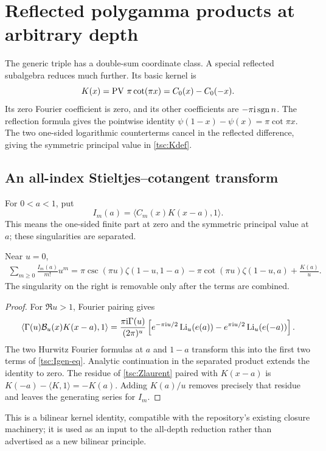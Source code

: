 \section{Reflected polygamma products at arbitrary depth}\label{tsc:reflected}
The generic triple has a double-sum coordinate class. A special reflected
subalgebra reduces much further. Its basic kernel is
\begin{equation}\label{tsc:Kdef}
 K(x)=\operatorname{PV}\,\pi\cot(\pi x)=C_0(x)-C_0(-x).
\end{equation}
Its zero Fourier coefficient is zero, and its other coefficients are
$-\pi\mathrm i\operatorname{sgn} n$. The reflection formula gives the pointwise identity
$\psi(1-x)-\psi(x)=\pi\cot\pi x$. The two one-sided logarithmic
counterterms cancel in the reflected difference, giving the symmetric
principal value in \eqref{tsc:Kdef}.

\subsection{An all-index Stieltjes--cotangent transform}
For $0<a<1$, put
\begin{equation}\label{tsc:Idef}
 I_m(a)=\langle C_m(x)K(x-a),1\rangle.
\end{equation}
This means the one-sided finite part at zero and the symmetric principal
value at $a$; these singularities are separated.

\begin{proposition}\label{tsc:Igen}
Near $u=0$,
\begin{align}\label{tsc:Igen-eq}
 \sum_{m\ge0}\frac{I_m(a)}{m!}u^m
  =\pi\csc(\pi u)\zeta(1-u,1-a)
     -\pi\cot(\pi u)\zeta(1-u,a)+\frac{K(a)}u.
\end{align}
The singularity on the right is removable only after the terms are combined.
\end{proposition}
\begin{proof}
For $\Re u>1$, Fourier pairing gives
\begin{align*}
 \langle\Gamma(u)\mathcal B_u(x)K(x-a),1\rangle
 =\frac{\pi\mathrm i\Gamma(u)}{(2\pi)^u}
   \left[e^{-\pi\mathrm i u/2}\operatorname{Li}_u(e(a))
               -e^{\pi\mathrm i u/2}\operatorname{Li}_u(e(-a))\right].
\end{align*}
The two Hurwitz Fourier formulas at $a$ and $1-a$ transform this into
the first two terms of \eqref{tsc:Igen-eq}. Analytic continuation in the
separated product extends the identity to zero. The residue of
\eqref{tsc:Zlaurent} paired with $K(x-a)$ is
$K(-a)-\langle K,1\rangle=-K(a)$. Adding $K(a)/u$ removes precisely that
residue and leaves the generating series for $I_m$.
\end{proof}
This is a bilinear kernel identity, compatible with the repository's
existing closure machinery; it is used as an input to the all-depth
reduction rather than advertised as a new bilinear principle.

